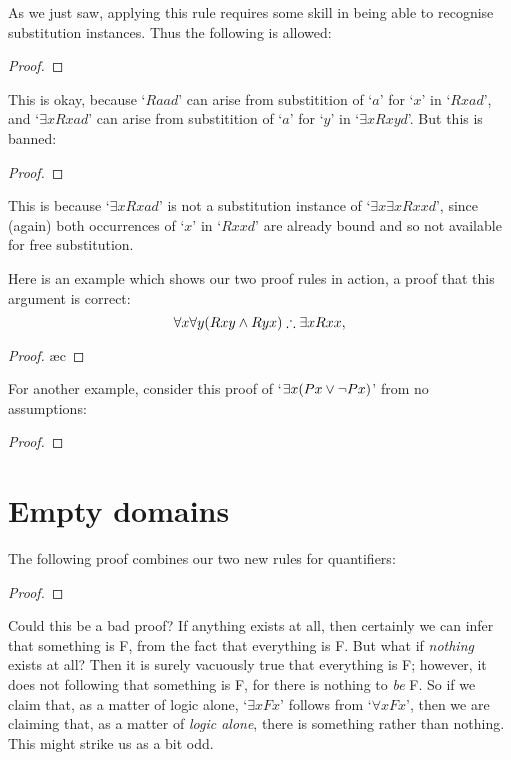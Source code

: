 As we just saw, applying this rule requires some skill in being able to recognise substitution instances. Thus the following is allowed:
\begin{proof}
	 
	 
\end{proof} This is okay, because `$Raad$' can arise from substitition of `$a$' for `$x$' in `$Rxad$', and `$\exists x Rxad$' can arise from substitition of `$a$' for `$y$' in `$\exists x Rxyd$'.
But this is banned:
\begin{proof}
	 
\end{proof} This is because `$\exists x Rxad$' is not a substitution instance of `$\exists x \exists x Rxxd$', since (again) both occurrences of `$x$' in `$Rxxd$' are already bound and so not available for free substitution.

Here is an example which shows our two proof rules in action, a proof that this argument is correct: $$\forall x \forall y (Rxy \wedge Ryx) \mathrel{\therefore} \exists x Rxx,$$ \begin{proof}
	\ae{c}
\end{proof}

For another example, consider this proof of `$\exists x (Px \vee \neg Px)$' from no assumptions\label{exexmid}: 
\begin{proof}
	\open{}
	\open{}
	\close
	\close
\end{proof}


\section{Empty domains}
The following proof combines our two new rules for quantifiers:
	\begin{proof}
	\end{proof}
Could this be a bad proof? If anything exists at all, then certainly we can infer that something is F, from the fact that everything is F. But what if \emph{nothing} exists at all? Then it is surely vacuously true that everything is F; however, it does not following that something is F, for there is nothing to \emph{be} F. So if we claim that, as a matter of logic alone, `$\exists x Fx$' follows from `$\forall x Fx$', then we are claiming that, as a matter of \emph{logic alone}, there is something rather than nothing. This might strike us as a bit odd.

